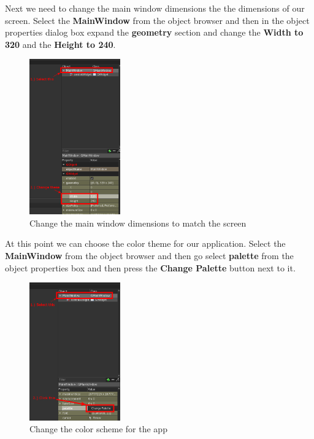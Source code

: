 \documentclass{article}
\begin{document}
Next we need to change the main window dimensions the the dimensions of our screen. Select the \textbf{MainWindow} from the object browser and then in the object properties dialog box expand the \textbf{geometry} section and change the \textbf{Width to 320} and the \textbf{Height to 240}.

	\begin{figure}[H]
		\centering
		\includegraphics[width=0.35\textwidth]{pics/Set_Geometry.png}
		\caption{Change the main window dimensions to match the screen}
		\label{Set_Geometry}
	\end{figure}

At this point we can choose the color theme for our application. Select the \textbf{MainWindow} from the object browser and then go select \textbf{palette} from the object properties box and then press the \textbf{Change Palette} button next to it.

	\begin{figure}[H]
		\centering
		\includegraphics[width=0.35\textwidth]{pics/Change_Palette.png}
		\caption{Change the color scheme for the app}
		\label{Change_Palette}
	\end{figure}
\end{document}
